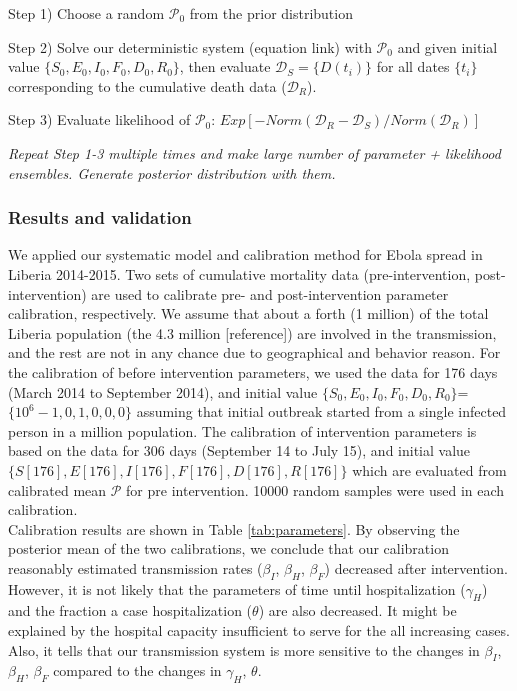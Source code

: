 Step 1) Choose a random $\mathcal{P}_0$ from the prior distribution

Step 2) Solve our deterministic system (equation link) with $\mathcal{P}_0$ and given initial value $\{S_0,E_0,I_0,F_0,D_0,R_0\}$, then evaluate $\mathcal{D}_S=\{D(t_i)\}$ for all dates $\{t_i\}$ corresponding to the cumulative death data ($\mathcal{D}_R$).

Step 3) Evaluate likelihood of $\mathcal{P}_0$: $Exp[-Norm(\mathcal{D}_R-\mathcal{D}_S)/Norm(\mathcal{D}_R)]$

\emph{Repeat Step 1-3 multiple times and make large number of {parameter + likelihood} ensembles. Generate posterior distribution with them.}

\subsubsection{Results and validation}
We applied our systematic model and calibration method for Ebola spread in Liberia 2014-2015. Two sets of cumulative mortality data (pre-intervention, post-intervention) are used to calibrate pre- and post-intervention parameter calibration, respectively. We assume that about a forth (1 million) of the total Liberia population (the 4.3 million [reference]) are involved in the transmission, and the rest are not in any chance due to geographical and behavior reason. For the calibration of before intervention parameters, we used the data for 176 days (March 2014 to September 2014), and initial value $\{S_0,E_0,I_0,F_0,D_0,R_0\}$=$\{10^6-1,0,1,0,0,0\}$ assuming that initial outbreak started from a single infected person in a million population. The calibration of intervention parameters is based on the data for 306 days (September 14 to July 15), and initial value $\{S[176],E[176],I[176],F[176],D[176],R[176]\}$ which are evaluated from calibrated mean $\mathcal{P}$ for pre intervention. 10000 random samples were used in each calibration.\\

Calibration results are shown in Table \ref{tab:parameters}. By observing the posterior mean of the two calibrations, we conclude that our calibration reasonably estimated transmission rates ($\beta_I$, $\beta_H$, $\beta_F$) decreased after intervention. However, it is not likely that the parameters of time until hospitalization ($\gamma_H$) and the fraction a case hospitalization ($\theta$) are also decreased. It might be explained by the hospital capacity insufficient to serve for the all increasing cases. Also, it tells that our transmission system is more sensitive to the changes in {$\beta_I$, $\beta_H$, $\beta_F$} compared to the changes in {$\gamma_H$, $\theta$}.\\

